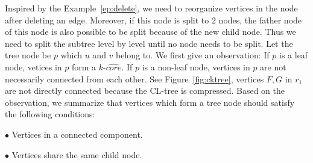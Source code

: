 Inspired by the Example~\ref{ep:delete}, we need to reorganize vertices in the node after deleting an edge. Moreover, if this node is split to 2 nodes, the father node of this node is also possible to be split because of the new child node. Thus we need to split the subtree level by level until no node needs to be split. 
Let the tree node be $p$ which $u$ and $v$ belong to. We first give an observation: If $p$ is a leaf node, vetices in $p$ form a $k$-$\widehat{core}$. If $p$ is a non-leaf node, vertices in $p$ are not necessarily connected from each other. See Figure~\ref{fig:cktree}, vertices $F, G$ in $r_1$ are not directly connected because the CL-tree is compressed.
Based on the observation, we summarize that vertices which form a tree node should satisfy the following conditions:

$\bullet$ Vertices in a connected component.

$\bullet$ Vertices share the same child node.

